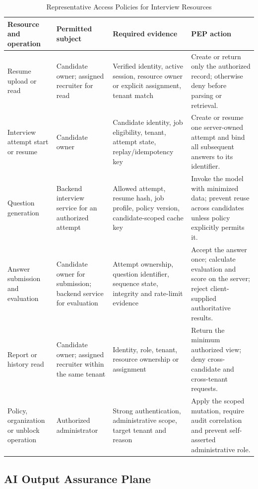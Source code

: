 \documentclass[conference]{IEEEtran}
\begin{document}
\begin{table}[t]
\caption{Representative Access Policies for Interview Resources}
\label{tab:access-policy}
\centering
\footnotesize
\renewcommand{\arraystretch}{1.12}
\begin{tabular}{@{}p{}p{}p{}p{}@{}}
\toprule
\textbf{Resource and operation} & \textbf{Permitted subject} & \textbf{Required evidence} & \textbf{PEP action} \\
\midrule
Resume upload or read & Candidate owner; assigned recruiter for read & Verified identity, active session, resource owner or explicit assignment, tenant match & Create or return only the authorized record; otherwise deny before parsing or retrieval. \\
Interview attempt start or resume & Candidate owner & Candidate identity, job eligibility, tenant, attempt state, replay/idempotency key & Create or resume one server-owned attempt and bind all subsequent answers to its identifier. \\
Question generation & Backend interview service for an authorized attempt & Allowed attempt, resume hash, job profile, policy version, candidate-scoped cache key & Invoke the model with minimized data; prevent reuse across candidates unless policy explicitly permits it. \\
Answer submission and evaluation & Candidate owner for submission; backend service for evaluation & Attempt ownership, question identifier, sequence state, integrity and rate-limit evidence & Accept the answer once; calculate evaluation and score on the server; reject client-supplied authoritative results. \\
Report or history read & Candidate owner; assigned recruiter within the same tenant & Identity, role, tenant, resource ownership or assignment & Return the minimum authorized view; deny cross-candidate and cross-tenant requests. \\
Policy, organization or unblock operation & Authorized administrator & Strong authentication, administrative scope, target tenant and reason & Apply the scoped mutation, require audit correlation and prevent self-asserted administrative role. \\
\bottomrule
\end{tabular}
\end{table}

\subsection{AI Output Assurance Plane}
\end{document}
